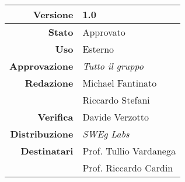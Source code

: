 \begin{center}
\begin{tabular}{r|l}
    \textbf{Versione} & 1.0 \\
    \hline
    \textbf{Stato} & Approvato \\
    \hline
    \textbf{Uso} & Esterno \\
    \hline
    \textbf{Approvazione} & \emph{Tutto il gruppo} \\
    \hline
    \textbf{Redazione} & Michael Fantinato \\
                       & Riccardo Stefani \\
    \hline
    \textbf{Verifica} & Davide Verzotto \\
    \hline
    \textbf{Distribuzione} & \emph{SWEg Labs} \\
    \hline
    \textbf{Destinatari} & Prof. Tullio Vardanega \\
                         & Prof. Riccardo Cardin \\
\end{tabular}
\end{center}
